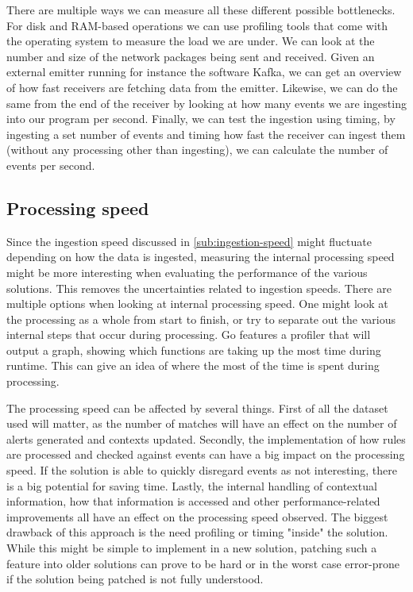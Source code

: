 There are multiple ways we can measure all these different possible bottlenecks. For disk and RAM-based operations we can use profiling tools that come with the operating system to measure the load we are under. We can look at the number and size of the network packages being sent and received. Given an external emitter running for instance the software Kafka, we can get an overview of how fast receivers are fetching data from the emitter. Likewise, we can do the same from the end of the receiver by looking at how many events we are ingesting into our program per second. Finally, we can test the ingestion using timing, by ingesting a set number of events and timing how fast the receiver can ingest them (without any processing other than ingesting), we can calculate the number of events per second.

\subsection{Processing speed}
\label{subs:processing-speed}
Since the ingestion speed discussed in \ref{sub:ingestion-speed} might fluctuate depending on how the data is ingested, measuring the internal processing speed might be more interesting when evaluating the performance of the various solutions. This removes the uncertainties related to ingestion speeds. There are multiple options when looking at internal processing speed. One might look at the processing as a whole from start to finish, or try to separate out the various internal steps that occur during processing. Go features a profiler that will output a graph, showing which functions are taking up the most time during runtime. This can give an idea of where the most of the time is spent during processing.

The processing speed can be affected by several things. First of all the dataset used will matter, as the number of matches will have an effect on the number of alerts generated and contexts updated.
Secondly, the implementation of how rules are processed and checked against events can have a big impact on the processing speed. If the solution is able to quickly disregard events as not interesting, there is a big potential for saving time.
Lastly, the internal handling of contextual information, how that information is accessed and other performance-related improvements all have an effect on the processing speed observed.
The biggest drawback of this approach is the need profiling or timing "inside" the solution. While this might be simple to implement in a new solution, patching such a feature into older solutions can prove to be hard or in the worst case error-prone if the solution being patched is not fully understood.

